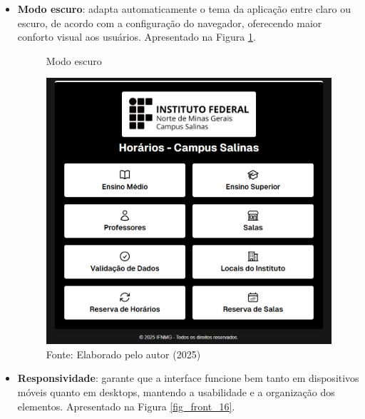 \begin{itemize}
    \item \textbf{Modo escuro}: adapta automaticamente o tema da aplicação entre claro ou escuro, de acordo com a configuração do navegador, oferecendo maior conforto visual aos usuários. Apresentado na Figura \ref{fig_front_15}.

    \begin{figure}[htb]
        \centering
        \caption{Modo escuro}
        \includegraphics[width=1\textwidth]{Figuras/front-15.png}
        \caption*{Fonte: Elaborado pelo autor (2025)}
        \label{fig_front_15}
    \end{figure}

    \item \textbf{Responsividade}: garante que a interface funcione bem tanto em dispositivos móveis quanto em desktops, mantendo a usabilidade e a organização dos elementos. Apresentado na Figura \ref{fig_front_16}.


\end{itemize}

